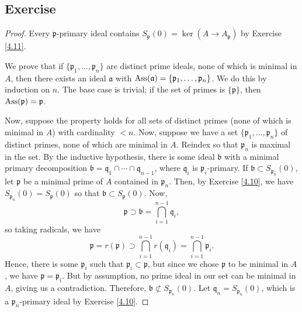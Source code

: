 \subsection{Exercise}\label{4.19}

\begin{proof}
Every $\mathfrak{p}$-primary ideal contains $S_{\mathfrak{p}}(0) = \ker (A \to A_{\mathfrak{p}})$ by Exercise \ref{4.11}.

We prove that if $\{\mathfrak{p}_1,\ldots,\mathfrak{p}_n\}$ are distinct prime ideals, none of which is minimal in $A$, then there exists an ideal $\mathfrak{a}$ with
$\operatorname{Ass}(\mathfrak{a}) = \{\mathfrak{p}_1,\ldots,\mathfrak{p}_n\}$. We do this by induction on $n$. The base case is trivial; if the set of primes is $\{\mathfrak{p}\}$, then 
$\operatorname{Ass}(\mathfrak{p}) = \mathfrak{p}$.

Now, suppose the property holds for all sets of distinct primes (none of which is minimal in $A$) with cardinality $< n$. Now, suppose we have a set $\{\mathfrak{p}_1,\ldots,\mathfrak{p}_n\}$
of distinct primes, none of which are minimal in $A$. Reindex so that $\mathfrak{p}_n$ is maximal in the set. By the inductive hypothesis, there is some ideal $\mathfrak{b}$ with a minimal
primary decomposition $\mathfrak{b} = \mathfrak{q}_1 \cap \cdots \cap \mathfrak{q}_{n-1}$, where $\mathfrak{q}_i$ is $\mathfrak{p}_i$-primary. If $\mathfrak{b} \subset S_{\mathfrak{p}_n}(0)$,
let $\mathfrak{p}$ be a minimal prime of $A$ contained in $\mathfrak{p}_n$. Then, by Exercise \ref{4.10}, we have $S_{\mathfrak{p}_n}(0) = S_{\mathfrak{p}}(0)$ so that 
$\mathfrak{b} \subset S_{\mathfrak{p}}(0)$. Now,
$$\mathfrak{p} \supset \mathfrak{b} = \bigcap_{i=1}^{n-1}\mathfrak{q}_i,$$
so taking radicals, we have
$$\mathfrak{p} = r(\mathfrak{p}) \supset \bigcap_{i=1}^{n-1}r(\mathfrak{q}_i) = \bigcap_{i=1}^{n-1}\mathfrak{p}_i.$$
Hence, there is some $\mathfrak{p}_i$ such that $\mathfrak{p}_i \subset \mathfrak{p}$, but since we chose $\mathfrak{p}$ to be minimal in $A$, we have $\mathfrak{p} = \mathfrak{p}_i$. But
by assumption, no prime ideal in our set can be minimal in $A$, giving us a contradiction. Therefore, $\mathfrak{b} \not\subset S_{\mathfrak{p}_n}(0)$. Let $\mathfrak{q}_n = S_{\mathfrak{p}_n}(0)$,
which is a $\mathfrak{p}_n$-primary ideal by Exercise \ref{4.10}.


\end{proof}
